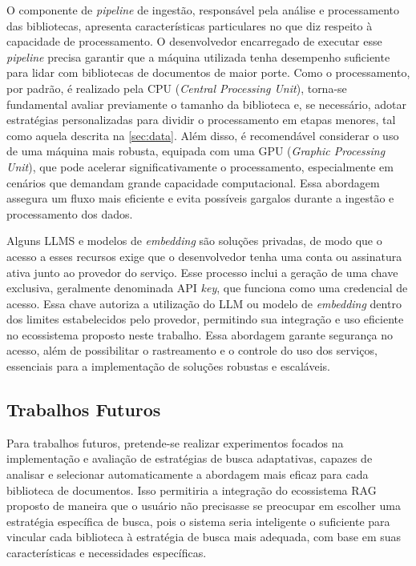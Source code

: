 \documentclass[a4paper, 12pt]{article}
\begin{document}
    O componente de \textit{pipeline} de ingestão, responsável pela análise e processamento das bibliotecas, apresenta características particulares no que diz respeito à capacidade de processamento. O desenvolvedor encarregado de executar esse \textit{pipeline} precisa garantir que a máquina utilizada tenha desempenho suficiente para lidar com bibliotecas de documentos de maior porte. Como o processamento, por padrão, é realizado pela CPU (\textit{Central Processing Unit}), torna-se fundamental avaliar previamente o tamanho da biblioteca e, se necessário, adotar estratégias personalizadas para dividir o processamento em etapas menores, tal como aquela descrita na \autoref{sec:data}. Além disso, é recomendável considerar o uso de uma máquina mais robusta, equipada com uma GPU (\textit{Graphic Processing Unit}), que pode acelerar significativamente o processamento, especialmente em cenários que demandam grande capacidade computacional. Essa abordagem assegura um fluxo mais eficiente e evita possíveis gargalos durante a ingestão e processamento dos dados.

    Alguns LLMS e modelos de \textit{embedding} são soluções privadas, de modo que o acesso a esses recursos exige que o desenvolvedor tenha uma conta ou assinatura ativa junto ao provedor do serviço. Esse processo inclui a geração de uma chave exclusiva, geralmente denominada API \textit{key}, que funciona como uma credencial de acesso. Essa chave autoriza a utilização do LLM ou modelo de \textit{embedding} dentro dos limites estabelecidos pelo provedor, permitindo sua integração e uso eficiente no ecossistema proposto neste trabalho. Essa abordagem garante segurança no acesso, além de possibilitar o rastreamento e o controle do uso dos serviços, essenciais para a implementação de soluções robustas e escaláveis.

    \subsection{Trabalhos Futuros}
    
    Para trabalhos futuros, pretende-se realizar experimentos focados na implementação e avaliação de estratégias de busca adaptativas, capazes de analisar e selecionar automaticamente a abordagem mais eficaz para cada biblioteca de documentos. Isso permitiria a integração do ecossistema RAG proposto de maneira que o usuário não precisasse se preocupar em escolher uma estratégia específica de busca, pois o sistema seria inteligente o suficiente para vincular cada biblioteca à estratégia de busca mais adequada, com base em suas características e necessidades específicas.
\end{document}

